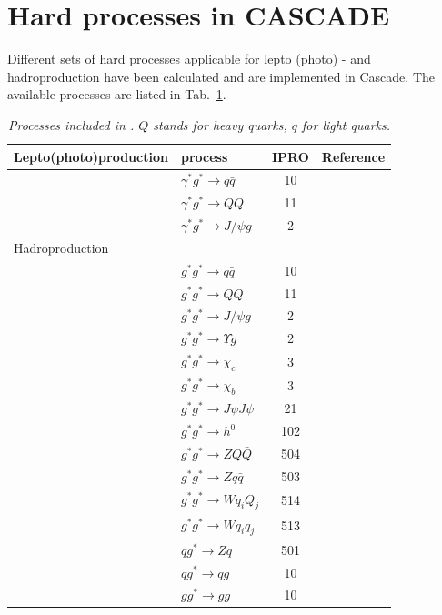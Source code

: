 \documentclass[11pt]{article} \usepackage{mystyle-new}
\def\CASCADE{{\sc Cascade}}
\begin{document}
\section{Hard processes in CASCADE}
Different sets of hard processes applicable for lepto (photo) - and hadroproduction have been calculated and are implemented in \CASCADE . The available processes are listed in Tab.~\ref{processes}.
\begin{table}[htp]
\begin{center}
\begin{tabular}{|l||l|c|c|}
\hline 
Lepto(photo)production &process & IPRO & Reference \\ 
\hline
&$\gamma^* g^* \to q\bar{q} $ & 10 & \protect\cite{Catani:1990eg} \\
&$\gamma^* g^* \to Q\bar{Q} $ & 11 & \protect\cite{Catani:1990eg} \\ 
&$\gamma^* g^* \to J/\psi g $ & 2 & \protect\cite{saleev_zotov_a,Lipatov:2002tc, Baranov:2003at,Baranov:2002cf} \\
\hline
Hadroproduction& & &  \\
\hline
&$g^* g^* \to q\bar{q} $ & 10 & \protect\cite{Catani:1990eg} \\
&$g^* g^* \to Q\bar{Q} $ & 11 & \protect\cite{Catani:1990eg} \\ 
&$g^* g^* \to J/\psi g $ & 2 & \protect\cite{Baranov:2002cf} \\
&$g^* g^* \to \Upsilon g $ & 2 & \protect\cite{Baranov:2002cf} \\
&$g^* g^* \to \chi_c $ & 3 & \protect\cite{Baranov:2002cf} \\
&$g^* g^* \to \chi_b $ & 3 &\cite{Baranov:2002cf} \\
&$g^* g^* \to J\psi J\psi $ & 21 &\cite{Baranov:2011zz} \\
&$g^* g^* \to h^0 $ & 102 & \protect\cite{hautmann-higgs} \\
&$g^* g^* \to Z Q \bar{Q} $ & 504 & \protect\cite{Baranov:2008hj,Deak:2008ky} \\
&$g^* g^* \to Z q \bar{q} $ & 503 & \protect\cite{Baranov:2008hj,Deak:2008ky} \\
&$g^* g^* \to W q_i Q_j $ & 514 & \protect\cite{Baranov:2008hj,Deak:2008ky} \\
&$g^* g^* \to W q_i q_j $ & 513 & \protect\cite{Baranov:2008hj,Deak:2008ky} \\
&$q g^* \to Z q $ & 501 & \protect\cite{Marzani:2008uh} \\
&$q g^* \to qg $ & 10 & \protect\cite{deak} \\
&$g g^* \to gg $ & 10 & \protect\cite{deak} \\
\hline
\end{tabular}
\caption{\it Processes included in \protect\CASCADE . $Q$ stands for heavy quarks, $q$ for light quarks.}\label{processes}
\end{center}
\end{table}%
\end{document}

